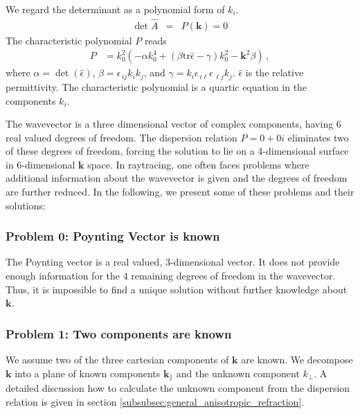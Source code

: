 \documentclass[12pt,a4paper,twoside,openright,BCOR10mm,headsepline,titlepage,abstracton,chapterprefix,final]{scrreprt}
\newcommand\Vector[1]{{\mathbf{#1}}}
\newcommand\wavenumber{k}
\newcommand\Wavevector{\Vector{\wavenumber}}
\newcommand\Tensor[1]{\hat{#1}}
\newcommand\scalarrelativepermittivity{\epsilon}
\newcommand\relativepermittivity{\Tensor{\scalarrelativepermittivity}}
\newcommand\tr{\text{tr}}
\begin{document}
We regard the determinant as a polynomial form of $\wavenumber_i$.
\begin{eqnarray}
 \det \hat{A} &=& P(\Wavevector) = 0
\end{eqnarray}
The characteristic polynomial $P$ reads
\begin{align}
 P &= k_0^2 \left( -\alpha k_0^4 +  (\beta \tr\relativepermittivity - \gamma) k_0^2 - \Vector{k}^2 \beta \right)\,,\label{eq:dispersion_determinant_invariant}
\end{align}
where 
$\alpha = \det(\relativepermittivity)$,
$\beta = \scalarrelativepermittivity_{\,ij} k_i k_j$, 
and
$\gamma = k_i \scalarrelativepermittivity_{\,i\ell} \scalarrelativepermittivity_{\,\ell j} k_j$.
$\relativepermittivity$ is the  relative permittivity.
The characteristic polynomial is a quartic equation in the components $\wavenumber_i$.

The wavevector is a three dimensional vector of complex components, having 6 real valued degrees of freedom.
The dispersion relation $P=0+0i$ eliminates two of these degrees of freedom,
forcing the solution to lie on a 4-dimensional surface in 6-dimensional $\Wavevector$ space.
In raytracing, one often faces problems where additional information about the wavevector is given and the
degrees of freedom are further reduced. In the following, we present some of these problems and their solutions:

\subsubsection{Problem 0: Poynting Vector is known}
The Poynting vector is a real valued, 3-dimensional vector.
It does not provide enough information for the 4 remaining degrees of freedom in the wavevector.
Thus, it is impossible to find a unique solution without further knowledge about $\Wavevector$.

\subsubsection{Problem 1: Two components are known}

We assume two of the three cartesian components of $\Wavevector$ are known.
We decompose $\Wavevector$ into a plane of known components $\Wavevector_\parallel$ and the unknown component $\wavenumber_\perp$. 
A detailed discussion how to calculate the unknown component from the dispersion relation
is given in section \ref{subsubsec:general_anisotropic_refraction}.
\end{document}
